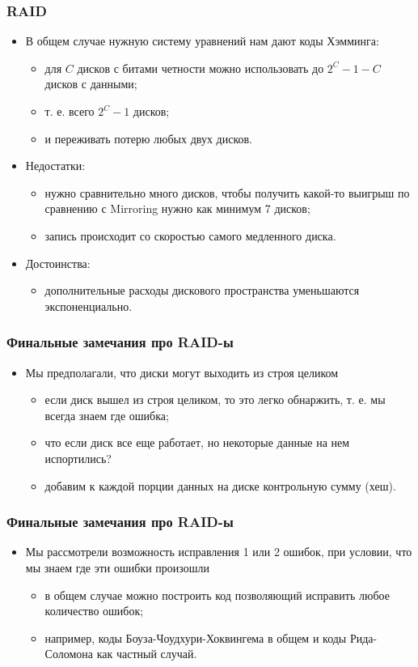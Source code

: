 \begin{frame}
\frametitle{RAID}
\begin{itemize}
  \item В общем случае нужную систему уравнений нам дают коды Хэмминга:
  \begin{itemize}
    \item для $C$ дисков с битами четности можно использовать до $2^C - 1 - C$
    дисков с данными;
    \item т. е. всего $2^C - 1$ дисков;
    \item и переживать потерю любых двух дисков.
  \end{itemize}
  \item Недостатки:
  \begin{itemize}
    \item нужно сравнительно много дисков, чтобы получить какой-то выигрыш по
    сравнению с Mirroring нужно как минимум 7 дисков;
    \item запись происходит со скоростью самого медленного диска.
  \end{itemize}
  \item Достоинства:
  \begin{itemize}
    \item дополнительные расходы дискового пространства уменьшаются
    экспоненциально.
  \end{itemize}
\end{itemize}
\end{frame}

\begin{frame}
\frametitle{Финальные замечания про RAID-ы}
\begin{itemize}
  \item Мы предполагали, что диски могут выходить из строя целиком
  \begin{itemize}
    \item если диск вышел из строя целиком, то это легко обнаржить, т. е. мы
    всегда знаем где ошибка;
    \item что если диск все еще работает, но некоторые данные на нем
    испортились?
    \item добавим к каждой порции данных на диске контрольную сумму (хеш).
  \end{itemize}
\end{itemize}
\end{frame}

\begin{frame}
\frametitle{Финальные замечания про RAID-ы}
\begin{itemize}
  \item Мы рассмотрели возможность исправления 1 или 2 ошибок, при условии, что
  мы знаем где эти ошибки произошли
  \begin{itemize}
    \item в общем случае можно построить код позволяющий исправить любое
    количество ошибок;
    \item например, коды Боуза-Чоудхури-Хоквингема в общем и коды Рида-Соломона
    как частный случай.
  \end{itemize}
\end{itemize}
\end{frame}
